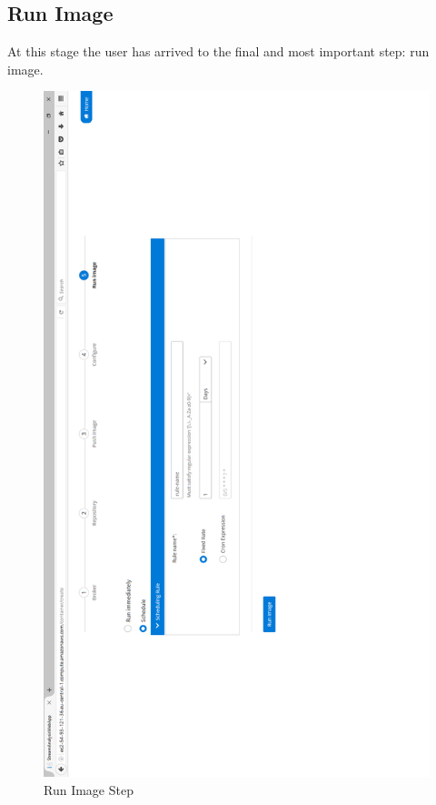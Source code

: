 \newpage

\subsection{Run Image}
\label{chap:05:01:05}

At this stage the user has arrived to the final and most important step: run image.

\begin{figure}[p]
	\centering
	\noindent
	\includegraphics[width=0.5\paperwidth]{./images/guide/container/runImage.PNG}
	\caption{Run Image Step}
	\label{fig:runImage}
\end{figure}

